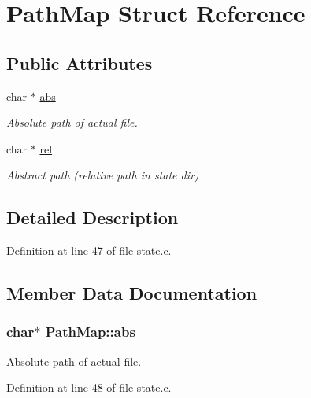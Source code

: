 \hypertarget{struct_path_map}{}\section{Path\+Map Struct Reference}
\label{struct_path_map}
\subsection*{Public Attributes}
\begin{DoxyCompactItemize}
\item 
char $\ast$ \hyperlink{struct_path_map_ac81041d4c899a4862b6e0b319bb87a56}{abs}
\begin{DoxyCompactList}\small\item\em Absolute path of actual file. \end{DoxyCompactList}\item 
char $\ast$ \hyperlink{struct_path_map_aed8f9263efdca8b96ea67526ae9d8280}{rel}
\begin{DoxyCompactList}\small\item\em Abstract path (relative path in state dir) \end{DoxyCompactList}\end{DoxyCompactItemize}


\subsection{Detailed Description}


Definition at line 47 of file state.\+c.



\subsection{Member Data Documentation}
\subsubsection[{\texorpdfstring{abs}{abs}}]{\setlength{\rightskip}{0pt plus 5cm}char$\ast$ Path\+Map\+::abs}\hypertarget{struct_path_map_ac81041d4c899a4862b6e0b319bb87a56}{}\label{struct_path_map_ac81041d4c899a4862b6e0b319bb87a56}


Absolute path of actual file. 



Definition at line 48 of file state.\+c.

